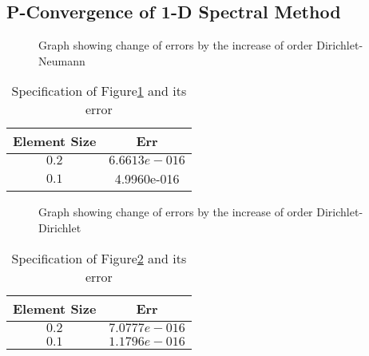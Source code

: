 \subsection {P-Convergence of 1-D Spectral Method}
\begin{figure}[h]
\begin{center}
\caption{\label{pconv1f}Graph showing change of errors by the
increase of order Dirichlet-Neumann}
\end{center}
\end{figure}


\begin{table}[h]
\centering \caption{\label{pconv1t} Specification of
                              Figure\ref{pconv1f} and its error}
\begin{tabular}{|c|c|} \hline
Element Size&Err   \\ \hline \hline $0.2$&$6.6613e-016$ \\ \hline
$0.1$&4.9960e-016 \\ \hline
\end{tabular}
\end{table}

\begin{figure}[h]
\begin{center}
\caption{\label{pconv2f}Graph showing change of errors by the
increase of order Dirichlet-Dirichlet}
\end{center}
\end{figure}


\begin{table}[h]
\centering \caption{\label{pconv2t} Specification of
                              Figure\ref{pconv2f} and its error}
\begin{tabular}{|c|c|} \hline
Element Size&Err   \\ \hline \hline $0.2$&$7.0777e-016$ \\ \hline
$0.1$&$1.1796e-016$ \\ \hline
\end{tabular}
\end{table}
